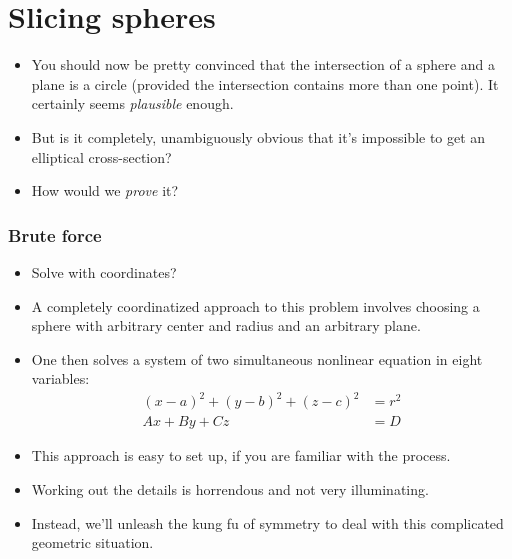 \documentclass[11pt,ignorenonframetext,aspectratio=169]{beamer}
\begin{document}
\section{Slicing spheres}

\begin{frame}

\begin{itemize}[<+->]
\item You should now be pretty convinced that the intersection of a sphere and a
plane is a circle (provided the intersection contains more than one point). It
certainly seems \emph{plausible} enough. 

\item But is it completely, unambiguously
obvious that it's impossible to get an elliptical cross-section?

\item How would we \emph{prove} it?
\end{itemize}

\end{frame}
\begin{frame}

\frametitle{Brute force}

\begin{itemize}[<+->]
\item Solve with coordinates? 

\item A completely coordinatized approach to this problem involves choosing a
sphere with arbitrary center and radius and an arbitrary plane. 

\item One then solves
a system of two simultaneous nonlinear equation in eight variables:
\begin{align*}
    (x - a)^2 + (y - b)^2 + (z - c)^2 &= r^2 \\
    Ax + By + Cz &= D 
\end{align*}
\end{itemize}

\end{frame}

\begin{frame}

\begin{itemize}[<+->]
\item This approach is easy to set up, if you are familiar with the process.

\item Working out the details is horrendous and not very illuminating. 

\item Instead, we'll unleash the kung fu of symmetry to deal with this complicated geometric situation.

\end{itemize}
\end{frame}
\end{document}

